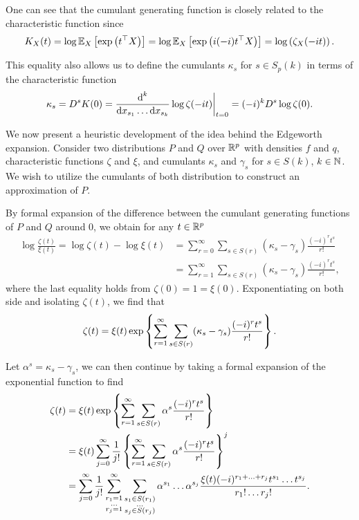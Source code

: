 \begin{remark}
    One can see that the cumulant generating function is closely related to the characteristic function since
    \begin{equation*}
        K_X(t) 
        = \log \mathbb{E}_{X}\left[\exp\left(t^\top X\right)\right] 
        = \log \mathbb{E}_{X}\left[\exp\left(i (-i)t^\top X\right)\right]
        = \log\left(\zeta_X(-it)\right).
    \end{equation*}

    This equality also allows us to define the cumulants $\kappa_s$ for $s \in S_p(k)$ in terms of the characteristic function
    \begin{equation*}
        \kappa_s = D^s K(0) 
        = \frac{\text{d}^k}{\text{d} x_{s_1} \ldots \text{d} x_{s_k}} \log \zeta(-it) \bigg|_{t=0}
        = (-i)^{k} D^s \log \zeta(0).
    \end{equation*}
\end{remark}

We now present a heuristic development of the idea behind the Edgeworth expansion. Consider two distributions $P$ and $Q$ over ${\mathbb{R}^p}$ with densities $f$ and $q$, characteristic functions $\zeta$ and $\xi$, and cumulants $\kappa_s$ and $\gamma_s$ for $s \in S(k)$, $k \in \mathbb{N}$. We wish to utilize the cumulants of both distribution to construct an approximation of $P$.

By formal expansion of the difference between the cumulant generating functions of $P$ and $Q$ around 0, we obtain for any $t \in {\mathbb{R}^p}$
\begin{align*}
    \log \frac{\zeta(t)}{\xi(t)}
    = \log \zeta(t) - \log \xi(t) 
    &= \sum_{r=0}^\infty \sum_{s \in S(r)} (\kappa_s - \gamma_s)\frac{(-i)^r t^s}{r!}\\
    &= \sum_{r=1}^\infty \sum_{s \in S(r)} (\kappa_s - \gamma_s)\frac{(-i)^r t^s}{r!},
\end{align*}
where the last equality holds from $\zeta(0) = 1 = \xi(0)$. Exponentiating on both side and isolating $\zeta(t)$, we find that
\begin{equation*}
    \zeta(t) = \xi(t)\exp\left\{\sum_{r=1}^\infty \sum_{s \in S(r)} (\kappa_s - \gamma_s)\frac{(-i)^r t^s}{r!}\right\}.
\end{equation*}

Let $\alpha^s = \kappa_s - \gamma_s$, we can then continue by taking a formal expansion of the exponential function to find
\begin{align*}
    \zeta(t)
    &= \xi(t)\exp\left\{\sum_{r=1}^\infty \sum_{s \in S(r)} \alpha^s\frac{(-i)^r t^s}{r!}\right\}\\
    &= \xi(t)\sum_{j=0}^\infty \frac{1}{j!} \left\{\sum_{r=1}^\infty \sum_{s \in S(r)} \alpha^s\frac{(-i)^r t^s}{r!}\right\}^j \\
    &=
    \sum_{j=0}^\infty \frac{1}{j!} 
    \sum_{\substack{r_1 = 1\\ \ldots \\r_j = 1}}^\infty
    \sum_{\substack{s_1 \in S(r_1)\\ \ldots \\s_j \in S(r_j)}}
    \alpha^{s_1}\ldots\alpha^{s_j}
    \frac{
        \xi(t) (-i)^{r_1 + \ldots + r_j}
        t^{s_1} \ldots t^{s_j}
    }{
        r_1! \ldots r_j!
    }.
\end{align*}

